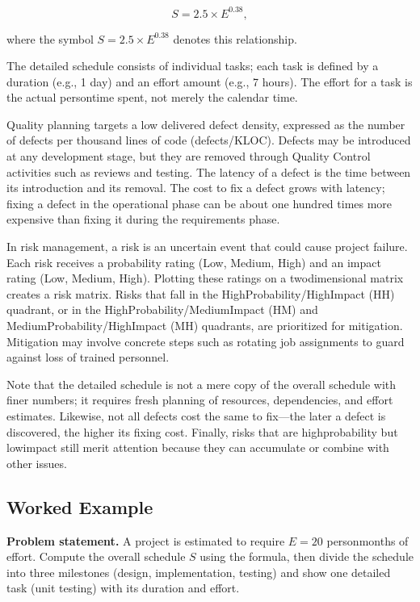 \documentclass[12pt, a4paper]{article}
\begin{document}
\[
S = 2.5 \times E^{0.38},
\]

where the symbol \(S = 2.5 \times E^{0.38}\) denotes this relationship.  

The detailed schedule consists of individual tasks; each task is defined by a duration (e.g., 1 day) and an effort amount (e.g., 7 hours).  The effort for a task is the actual persontime spent, not merely the calendar time.

Quality planning targets a low delivered defect density, expressed as the number of defects per thousand lines of code (defects/KLOC).  Defects may be introduced at any development stage, but they are removed through Quality Control activities such as reviews and testing.  The latency of a defect is the time between its introduction and its removal.  The cost to fix a defect grows with latency; fixing a defect in the operational phase can be about one hundred times more expensive than fixing it during the requirements phase.

In risk management, a risk is an uncertain event that could cause project failure.  Each risk receives a probability rating (Low, Medium, High) and an impact rating (Low, Medium, High).  Plotting these ratings on a twodimensional matrix creates a risk matrix.  Risks that fall in the HighProbability/HighImpact (HH) quadrant, or in the HighProbability/MediumImpact (HM) and MediumProbability/HighImpact (MH) quadrants, are prioritized for mitigation.  Mitigation may involve concrete steps such as rotating job assignments to guard against loss of trained personnel.

Note that the detailed schedule is not a mere copy of the overall schedule with finer numbers; it requires fresh planning of resources, dependencies, and effort estimates. Likewise, not all defects cost the same to fix---the later a defect is discovered, the higher its fixing cost.  Finally, risks that are highprobability but lowimpact still merit attention because they can accumulate or combine with other issues.

\subsection{Worked Example}
\textbf{Problem statement.}  
A project is estimated to require \(E = 20\) personmonths of effort.  Compute the overall schedule \(S\) using the formula, then divide the schedule into three milestones (design, implementation, testing) and show one detailed task (unit testing) with its duration and effort.
\end{document}
